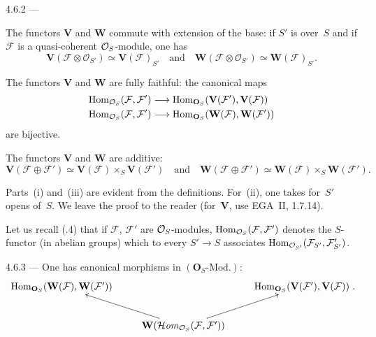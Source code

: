 \begin{proposition}{4.6.2}\label{I.4.6.2}
---
\begin{enumeratei}
\item The functors \(\mathbf{V}\) and \(\mathbf{W}\) commute with extension of the base: if \(S'\) is over~\(S\) and if \(\mathcal{F}\) is a quasi-coherent \(\mathcal{O}_S\)-module, one has
\[
\mathbf{V}(\mathcal{F} \otimes \mathcal{O}_{S'}) \simeq \mathbf{V}(\mathcal{F})_{S'}
\quad\text{and}\quad
\mathbf{W}(\mathcal{F} \otimes \mathcal{O}_{S'}) \simeq \mathbf{W}(\mathcal{F})_{S'}.
\]
\item The functors \(\mathbf{V}\) and \(\mathbf{W}\) are fully faithful: the canonical maps
\begin{align*}
\operatorname{Hom}_{\mathcal{O}_S}(\mathcal{F}, \mathcal{F}') &\longrightarrow \operatorname{Hom}_{\mathbf{O}_S}(\mathbf{V}(\mathcal{F}'), \mathbf{V}(\mathcal{F})) \\
\operatorname{Hom}_{\mathcal{O}_S}(\mathcal{F}, \mathcal{F}') &\longrightarrow \operatorname{Hom}_{\mathbf{O}_S}(\mathbf{W}(\mathcal{F}), \mathbf{W}(\mathcal{F}'))
\end{align*}
are bijective.
\item The functors \(\mathbf{V}\) and \(\mathbf{W}\) are additive:
\[
\mathbf{V}(\mathcal{F} \oplus \mathcal{F}') \simeq \mathbf{V}(\mathcal{F}) \times_{S} \mathbf{V}(\mathcal{F}')
\quad\text{and}\quad
\mathbf{W}(\mathcal{F} \oplus \mathcal{F}') \simeq \mathbf{W}(\mathcal{F}) \times_{S} \mathbf{W}(\mathcal{F}').
\]
\end{enumeratei}
\end{proposition}

Parts~(i) and~(iii) are evident from the definitions. For~(ii), one takes for~\(S'\) opens of~\(S\). We leave the proof to the reader (for~\(\mathbf{V}\), use EGA~II, 1.7.14).

Let us recall (.4) that if \(\mathcal{F}\), \(\mathcal{F}'\) are \(\mathcal{O}_S\)-modules, \(\operatorname{Hom}_{\mathcal{O}_S}(\mathcal{F}, \mathcal{F}')\) denotes the \(S\)-functor (in abelian groups) which to every \(S' \to S\) associates \(\operatorname{Hom}_{\mathcal{O}_{S'}}(\mathcal{F}_{S'}, \mathcal{F}'_{S'})\).

\begin{proposition}{4.6.3}\label{I.4.6.3}
--- {\renewcommand{\thefootnote}{(32)}}
One has canonical morphisms in \((\mathbf{O}_S\text{-Mod.})\):
\[
\xymatrix{
\Hom_{\mathbf{O}_S}(\mathbf{W}(\mathcal{F}), \mathbf{W}(\mathcal{F}'))
  & &
\Hom_{\mathbf{O}_S}(\mathbf{V}(\mathcal{F}'), \mathbf{V}(\mathcal{F}))
\\
& \mathbf{W}(\mathcal{H}\mathit{om}_{\OS}(\mathcal{F}, \mathcal{F}'))
  \ar[ul] \ar[ur]
&
}.
\]
\end{proposition}


